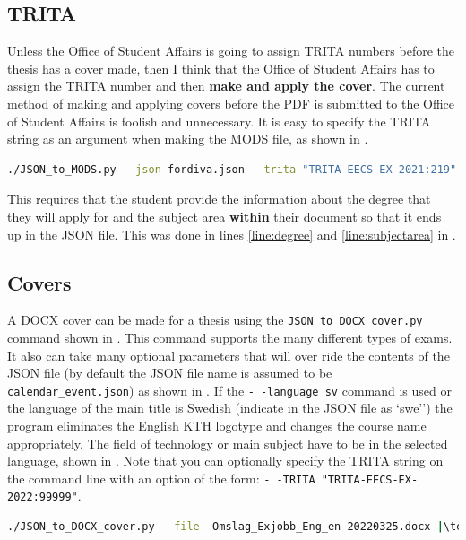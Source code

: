 \subsection{TRITA}
Unless the Office of Student Affairs is going to assign TRITA numbers before the thesis has a cover made, then I think that the Office of Student Affairs has to assign the TRITA number and then \textbf{make and apply the cover}. The current method of making and applying covers before the PDF is submitted to the Office of Student Affairs is foolish and unnecessary. It is easy to specify the TRITA string as an argument when making the MODS file, as shown in . 
\begin{lstlisting}[basicstyle=\footnotesize, language={bash}, caption={Command to make a MODS file with a specified TRITA string}, label=lst:specifyTRITA]
./JSON_to_MODS.py --json fordiva.json --trita "TRITA-EECS-EX-2021:219"
\end{lstlisting}

This requires that the student provide the information about the degree that they will apply for and the subject area \textbf{within} their document so that it ends up in the JSON file. This was done in lines  \ref{line:degree} and \ref{line:subjectarea} in .

\subsection{Covers}
A DOCX cover can be made for a thesis using the \texttt{JSON\_to\_DOCX\_cover.py} command shown in . This command supports the many different types of exams. It also can take many optional parameters that will over ride the contents of the JSON file (by default the JSON file name is assumed to be \texttt{calendar\_event.json}) as shown in . If the \texttt{\hbox{-\,-language sv}} command is used or the language of the main title is Swedish (indicate in the JSON file as `swe'') the program eliminates the English KTH logotype and changes the course name appropriately. The field of technology or main subject have to be in the selected language, shown in . Note that you can optionally specify the TRITA string on the command line with an option of the form:
\texttt{\hbox{-\,-TRITA  "TRITA-EECS-EX-2022:99999"}}.

\begin{lstlisting}[escapechar=|, basicstyle=\footnotesize, language={bash}, caption={Command to make a cover DOCX file with a specified TRITA string}, label=lst:JSONtoDOCXcover]
./JSON_to_DOCX_cover.py --file  Omslag_Exjobb_Eng_en-20220325.docx |\textbackslash \\| --exam kandidatexamen  --trita "TRITA-EECS-EX-2021:219"
\end{lstlisting}

